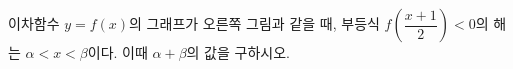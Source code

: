 \hspace*{2mm}\begin{minipage}[t]{\dimexpr\linewidth-2mm\relax}\vspace{0pt}
\noindent\begin{minipage}[t]{0.58\linewidth}\vspace{0pt}\raggedright 이차함수 $y=f(x)$의 그래프가 오른쪽 그림과 같을 때, 부등식 $f\left(\dfrac{x+1}{2}\right)<0$의 해는 $\alpha<x<\beta$이다. 이때 $\alpha+\beta$의 값을 구하시오.\end{minipage}\hfill\begin{minipage}[t]{0.4\linewidth}\vspace{0pt}\centering \resizebox{\ifdim\width>\linewidth\linewidth\else\width\fi}{!}{}\end{minipage}\par\end{minipage}
